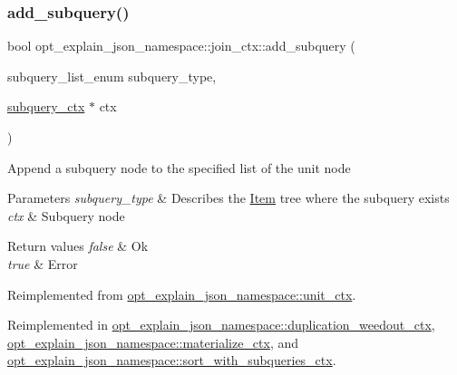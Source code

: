 \subsubsection{\texorpdfstring{add\+\_\+subquery()}{add\_subquery()}}
{\footnotesize\ttfamily bool opt\+\_\+explain\+\_\+json\+\_\+namespace\+::join\+\_\+ctx\+::add\+\_\+subquery (\begin{DoxyParamCaption}\item[{subquery\+\_\+list\+\_\+enum}]{subquery\+\_\+type,  }\item[{\mbox{\hyperlink{classopt__explain__json__namespace_1_1subquery__ctx}{subquery\+\_\+ctx}} $\ast$}]{ctx }\end{DoxyParamCaption})\hspace{0.3cm}{\ttfamily [virtual]}}

Append a subquery node to the specified list of the unit node


\begin{DoxyParams}{Parameters}
{\em subquery\+\_\+type} & Describes the \mbox{\hyperlink{classItem}{Item}} tree where the subquery exists \\
\hline
{\em ctx} & Subquery node\\
\hline
\end{DoxyParams}

\begin{DoxyRetVals}{Return values}
{\em false} & Ok \\
\hline
{\em true} & Error \\
\hline
\end{DoxyRetVals}


Reimplemented from \mbox{\hyperlink{classopt__explain__json__namespace_1_1unit__ctx_a157b828a313f01ec8bd7c4a53644f6b2}{opt\+\_\+explain\+\_\+json\+\_\+namespace\+::unit\+\_\+ctx}}.



Reimplemented in \mbox{\hyperlink{classopt__explain__json__namespace_1_1duplication__weedout__ctx_a2b570476015c26f58d8b7ec13cc11b4d}{opt\+\_\+explain\+\_\+json\+\_\+namespace\+::duplication\+\_\+weedout\+\_\+ctx}}, \mbox{\hyperlink{classopt__explain__json__namespace_1_1materialize__ctx_adcc1a9841e17f5abf74faf8d719d9700}{opt\+\_\+explain\+\_\+json\+\_\+namespace\+::materialize\+\_\+ctx}}, and \mbox{\hyperlink{classopt__explain__json__namespace_1_1sort__with__subqueries__ctx_a57c77821336044d261cca101925dfdf2}{opt\+\_\+explain\+\_\+json\+\_\+namespace\+::sort\+\_\+with\+\_\+subqueries\+\_\+ctx}}.

\mbox{\label{classopt__explain__json__namespace_1_1join__ctx_a6d8ebc9b02d479b1b93d2a55b1e1f5ef}} 
